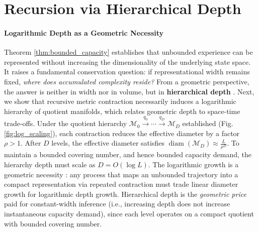 \documentclass{article}
\begin{document}
\section{Recursion via Hierarchical Depth}
\label{sec:recursive_depth}

\paragraph{Logarithmic Depth as a Geometric Necessity} 
Theorem \ref{thm:bounded_capacity} establishes that unbounded experience can be represented without increasing the dimensionality of the underlying state space.
It raises a fundamental conservation question: if representational width remains fixed, \emph{where does accumulated complexity reside?}
From a geometric perspective, the answer is neither in width nor in volume, but in \textbf{hierarchical depth} \cite{telgarsky2016benefits,poggio2017theory}.
Next, we show that recursive metric contraction necessarily induces a logarithmic hierarchy of quotient manifolds, which relates geometric depth to space-time trade-offs.
Under the quotient hierarchy $\mathcal{M}_0 \xrightarrow{q_0} \cdots \xrightarrow{q_D} \mathcal{M}_D$ established (Fig. \ref{fig:log_scaling}), each contraction reduces the effective diameter by a factor $\rho > 1$. After $D$ levels, the effective diameter satisfies
$\operatorname{diam}(\mathcal{M}_D) \approx \frac{L}{\rho^D}$.
To maintain a bounded covering number, and hence bounded capacity demand, the hierarchy depth must scale as
$D = O(\log L)$.
The logarithmic growth is a geometric necessity \cite{savitch1970relationships}: any process that maps an unbounded trajectory into a compact representation via repeated contraction must trade linear diameter growth for logarithmic depth growth. Hierarchical depth is the \emph{geometric price} paid for constant-width inference (i.e., increasing depth does not increase instantaneous capacity demand), since each level operates on a compact quotient with bounded covering number.
\end{document}
